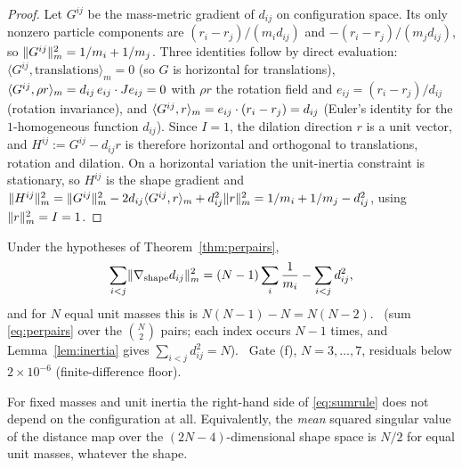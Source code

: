 \begin{proof}
Let $G^{ij}$ be the mass-metric gradient of $d_{ij}$ on configuration space. Its only nonzero
particle components are $(r_i-r_j)/(m_id_{ij})$ and $-(r_i-r_j)/(m_jd_{ij})$, so
$\lVert G^{ij}\rVert_m^2=1/m_i+1/m_j$. Three identities follow by direct evaluation:
$\langle G^{ij},\text{translations}\rangle_m=0$ (so $G$ is horizontal for translations),
$\langle G^{ij},\rho r\rangle_m=d_{ij}\,e_{ij}\cdot Je_{ij}=0$ with $\rho r$ the rotation field and
$e_{ij}=(r_i-r_j)/d_{ij}$ (rotation invariance), and $\langle G^{ij},r\rangle_m=e_{ij}\cdot(r_i-r_j)=d_{ij}$
(Euler's identity for the $1$-homogeneous function $d_{ij}$). Since $I=1$, the dilation direction
$r$ is a unit vector, and $H^{ij}:=G^{ij}-d_{ij}r$ is therefore horizontal and orthogonal to
translations, rotation and dilation. On a horizontal variation the unit-inertia constraint is
stationary, so $H^{ij}$ is the shape gradient and
$\lVert H^{ij}\rVert_m^2=\lVert G^{ij}\rVert_m^2-2d_{ij}\langle G^{ij},r\rangle_m+d_{ij}^2\lVert r\rVert_m^2=1/m_i+1/m_j-d_{ij}^2$,
using $\lVert r\rVert_m^2=I=1$.
\end{proof}

\begin{theorem}\label{thm:sumrule}
Under the hypotheses of Theorem~\ref{thm:perpairs},
\begin{equation}\label{eq:sumrule}
   \sum_{i<j}\lVert\nabla_{\mathrm{shape}}d_{ij}\rVert_m^2
   =(N-1)\sum_i\frac1{m_i}-\sum_{i<j}d_{ij}^2 ,
\end{equation}
and for $N$ equal unit masses this is $N(N-1)-N=N(N-2)$.
\T\ (sum \eqref{eq:perpairs} over the $\binom N2$ pairs; each index occurs $N-1$ times, and
Lemma~\ref{lem:inertia} gives $\sum_{i<j}d_{ij}^2=N$). \V\ Gate  (f),
$N=3,\dots,7$, residuals below $2\times10^{-6}$ (finite-difference floor).
\end{theorem}

\begin{corollary}\label{cor:total}
For fixed masses and unit inertia the right-hand side of \eqref{eq:sumrule} does not depend on
the configuration at all. Equivalently, the \emph{mean} squared singular value of the distance
map over the $(2N-4)$-dimensional shape space is $N/2$ for equal unit masses, whatever the shape.
\T
\end{corollary}

